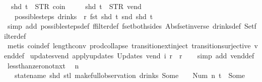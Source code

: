 \begin{isabellebody}
\ \ {\isachardoublequoteopen}shd\ t\ {\isasymnoteq}\ {\isacharparenleft}STR\ {\isacharprime}{\isacharprime}coin{\isacharprime}{\isacharprime}{\isacharcomma}\ {\isacharbrackleft}{\isacharbrackright}{\isacharparenright}\ {\isasymLongrightarrow}\isanewline
\ \ \ shd\ t\ {\isasymnoteq}\ {\isacharparenleft}STR\ {\isacharprime}{\isacharprime}vend{\isacharprime}{\isacharprime}{\isacharcomma}\ {\isacharbrackleft}{\isacharbrackright}{\isacharparenright}\ {\isasymLongrightarrow}\isanewline
\ \ \ possible{\isacharunderscore}steps\ drinks\ {}\ r\ {\isacharparenleft}fst\ {\isacharparenleft}shd\ t{\isacharparenright}{\isacharparenright}\ {\isacharparenleft}snd\ {\isacharparenleft}shd\ t{\isacharparenright}{\isacharparenright}\ {\isacharequal}\ {\isacharbraceleft}{\isacharbar}{\isacharbar}{\isacharbraceright}{\isachardoublequoteclose}\isanewline
%
\isadelimproof
\ \ %
\endisadelimproof
%
\isatagproof
{}\isamarkupfalse%
\ {\isacharparenleft}simp\ add{\isacharcolon}\ possible{\isacharunderscore}steps{\isacharunderscore}def\ ffilter{\isacharunderscore}def\ fset{\isacharunderscore}both{\isacharunderscore}sides\ Abs{\isacharunderscore}fset{\isacharunderscore}inverse\ drinks{\isacharunderscore}def\ Set{\isachardot}filter{\isacharunderscore}def{\isacharparenright}\isanewline
\ \ \isamarkupfalse%
\ {\isacharparenleft}metis\ coin{\isacharunderscore}def\ length{\isacharunderscore}{}{\isacharunderscore}conv\ prod{\isachardot}collapse\ transition{\isachardot}ext{\isacharunderscore}inject\ transition{\isachardot}surjective\ vend{\isacharunderscore}def{\isacharparenright}%
\endisatagproof
{\isafoldproof}%
%
\isadelimproof
\isanewline
%
\endisadelimproof
\isanewline
{}\isamarkupfalse%
\ updates{\isacharunderscore}vend{\isacharcolon}\ {\isachardoublequoteopen}apply{\isacharunderscore}updates\ {\isacharparenleft}Updates\ vend{\isacharparenright}\ i\ r\ {\isacharequal}\ r{\isachardoublequoteclose}\isanewline
%
\isadelimproof
\ \ %
\endisadelimproof
%
\isatagproof
{}\isamarkupfalse%
\ {\isacharparenleft}simp\ add{\isacharcolon}\ vend{\isacharunderscore}def{\isacharparenright}%
\endisatagproof
{\isafoldproof}%
%
\isadelimproof
\isanewline
%
\endisadelimproof
\isanewline
{}\isamarkupfalse%
\ less{\isacharunderscore}than{\isacharunderscore}zero{\isacharunderscore}not{\isacharunderscore}nxt{\isacharunderscore}{}{\isacharcolon}\isanewline
\ \ {\isachardoublequoteopen}n\ {\isasymle}\ {}\ {\isasymLongrightarrow}\isanewline
\ \ \ statename\ {\isacharparenleft}shd\ {\isacharparenleft}stl\ {\isacharparenleft}make{\isacharunderscore}full{\isacharunderscore}observation\ drinks\ {\isacharparenleft}Some\ {}{\isacharparenright}\ {\isacharparenleft}{\isacharless}{\isachargreater}{\isacharparenleft}{}\ {\isacharcolon}{\isacharequal}\ Num\ n{\isacharparenright}{\isacharparenright}\ t{\isacharparenright}{\isacharparenright}{\isacharparenright}\ {\isasymnoteq}\ Some\ {}{\isachardoublequoteclose}\isanewline

\end{isabellebody}
